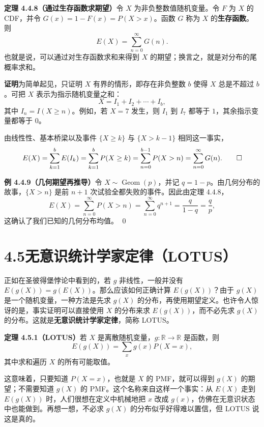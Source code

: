 \documentclass[UTF8,12pt,a4paper,fontset=fandol]{ctexart}
\begin{document}
\noindent\textbf{定理 4.4.8（通过生存函数求期望）}\quad 令 $X$ 为非负整数值随机变量。令 $F$ 为 $X$ 的 CDF，并令 $G(x)=1-F(x)=P(X>x)$。函数 $G$ 称为 $X$ 的\textbf{生存函数}。则
\[
  E(X)=\sum_{n=0}^{\infty}G(n).
\]
也就是说，可以通过对生存函数求和来得到 $X$ 的期望；换言之，就是对分布的尾概率求和。

\noindent\textbf{证明}\quad 为简单起见，只证明 $X$ 有界的情形，即存在非负整数 $b$ 使得 $X$ 总是不超过 $b$。可把 $X$ 表示为指示随机变量之和：
\[
  X=I_1+I_2+\cdots+I_b,
\]
其中 $I_n=I(X\ge n)$。例如，若 $X=7$ 发生，则 $I_1$ 到 $I_7$ 都等于 $1$，其余指示变量都等于 $0$。

由线性性、基本桥梁以及事件 $\{X\ge k\}$ 与 $\{X>k-1\}$ 相同这一事实，
\[
  E(X)=\sum_{k=1}^b E(I_k)
  =\sum_{k=1}^b P(X\ge k)
  =\sum_{n=0}^{b-1}P(X>n)
  =\sum_{n=0}^{\infty}G(n). \qed
\]

\noindent\textbf{例 4.4.9（几何期望再推导）}\quad 令 $X\sim\operatorname{Geom}(p)$，并记 $q=1-p$。由几何分布的故事，$\{X>n\}$ 是前 $n+1$ 次试验全都失败的事件。因此由定理 4.4.8，
\[
  E(X)=\sum_{n=0}^{\infty}P(X>n)
  =\sum_{n=0}^{\infty}q^{n+1}
  =\frac{q}{1-q}
  =\frac{q}{p},
\]
这确认了我们已知的几何分布均值。 \qed

\section*{4.5\quad 无意识统计学家定律（LOTUS）}

正如在圣彼得堡悖论中看到的，若 $g$ 非线性，一般并没有 $E(g(X))=g(E(X))$。那么应该如何正确计算 $E(g(X))$？由于 $g(X)$ 是一个随机变量，一种方法是先求 $g(X)$ 的分布，再使用期望定义。也许令人惊讶的是，事实证明可以直接使用 $X$ 的分布来求 $E(g(X))$，而不必先求 $g(X)$ 的分布。这就是\textbf{无意识统计学家定律}，简称 LOTUS。

\noindent\textbf{定理 4.5.1（LOTUS）}\quad 若 $X$ 是离散随机变量，$g:\mathbb{R}\to\mathbb{R}$ 是函数，则
\[
  E(g(X))=\sum_x g(x)P(X=x),
\]
其中求和遍历 $X$ 的所有可能取值。

这意味着，只要知道 $P(X=x)$，也就是 $X$ 的 PMF，就可以得到 $g(X)$ 的期望；不需要知道 $g(X)$ 的 PMF。这个名称来自这样一个事实：从 $E(X)$ 走到 $E(g(X))$ 时，人们很想在定义中机械地把 $x$ 改成 $g(x)$，仿佛在无意识状态中也能做到。再想一想，不必求 $g(X)$ 的分布似乎好得难以置信，但 LOTUS 说这是真的。
\end{document}
